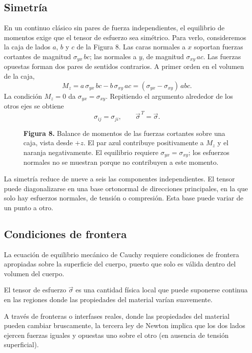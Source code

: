 \subsection{Simetría}

En un continuo clásico sin pares de fuerza independientes, el equilibrio de momentos exige que el tensor de esfuerzo sea simétrico. Para verlo, consideremos la caja de lados $a$, $b$ y $c$ de la Figura 8. Las caras normales a $x$ soportan fuerzas cortantes de magnitud $\sigma_{yx}\,bc$; las normales a $y$, de magnitud $\sigma_{xy}\,ac$. Las fuerzas opuestas forman dos pares de sentidos contrarios. A primer orden en el volumen de la caja,
\[
M_z=a\,\sigma_{yx}\,bc-b\,\sigma_{xy}\,ac
=(\sigma_{yx}-\sigma_{xy})\,abc.
\]
La condición $M_z=0$ da $\sigma_{yx}=\sigma_{xy}$. Repitiendo el argumento alrededor de los otros ejes se obtiene
\[
\sigma_{ij}=\sigma_{ji},
\qquad \vec\sigma^{\,T}=\vec\sigma.
\]

\begin{figure}[H]
\centering

\par\medskip
\textbf{Figura 8.} Balance de momentos de las fuerzas cortantes sobre una caja, vista desde $+z$. El par azul contribuye positivamente a $M_z$ y el naranja negativamente. El equilibrio requiere $\sigma_{yx}=\sigma_{xy}$; los esfuerzos normales no se muestran porque no contribuyen a este momento.
\end{figure}

La simetría reduce de nueve a seis las componentes independientes. El tensor puede diagonalizarse en una base ortonormal de direcciones principales, en la que solo hay esfuerzos normales, de tensión o compresión. Esta base puede variar de un punto a otro.

\subsection{Condiciones de frontera}

La ecuación de equilibrio mecánico de Cauchy requiere condiciones de frontera apropiadas sobre la superficie del cuerpo, puesto que solo es válida dentro del volumen del cuerpo.

El tensor de esfuerzo $\vec{\sigma}$ es una cantidad física local que puede suponerse continua en las regiones donde las propiedades del material varían suavemente.

A través de fronteras o interfases reales, donde las propiedades del material pueden cambiar bruscamente, la tercera ley de Newton implica que los dos lados ejercen fuerzas iguales y opuestas uno sobre el otro (en ausencia de tensión superficial).

